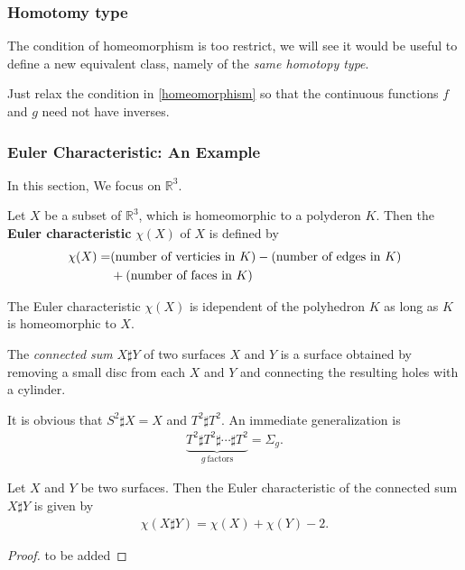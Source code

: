 \documentclass[10pt]{article}
\begin{document}
\subsubsection{Homotomy type}
\begin{intu}
    The condition of homeomorphism is too restrict, we will see it would be useful to define a new equivalent class, namely of the \textit{same homotopy type}.
\end{intu}

Just relax the condition in \cref{homeomorphism} so that the continuous functions $f$ and $g$ need not have inverses.

\subsubsection{Euler Characteristic: An Example}
In this section, We focus on $\mathbb{R}^3$.
\begin{definition}
    Let $X$ be a subset of $\mathbb{R}^3$, which is homeomorphic to a polyderon $K$.
    Then the \textbf{Euler characteristic} $\chi(X)$ of $X$ is defined by
    \begin{align}
        \chi(X)= & (\text{number of verticies in}\ K)-(\text{number of edges in}\ K)\notag \\
                 & +(\text{number of faces in}\ K)
    \end{align}
\end{definition}

\begin{theorem}
    The Euler characteristic $\chi(X)$ is idependent of the polyhedron $K$ as long as $K$ is homeomorphic to $X$.
\end{theorem}

The \textit{connected sum} $X \sharp Y$ of two surfaces $X$ and $Y$ is a surface obtained by removing a small disc from each $X$ and $Y$ and connecting the resulting holes with a cylinder.

It is obvious that $ S^{2} \sharp X=X $ and $T^{2}\sharp T^{2}$.
An immediate generalization is
\begin{align}
    \underbrace{T^{2}\sharp T^{2}\sharp\cdots\sharp T^{2}}_{g\ \text{factors}}=\Sigma_g.
\end{align}

\begin{theorem}
    Let $X$ and $Y$ be two surfaces.
    Then the Euler characteristic of the connected sum $X\sharp Y$ is given by
    \begin{align}
        \chi(X\sharp Y)=\chi(X)+\chi(Y)-2.
    \end{align}
\end{theorem}
\begin{proof}
    to be added
\end{proof}
\end{document}
